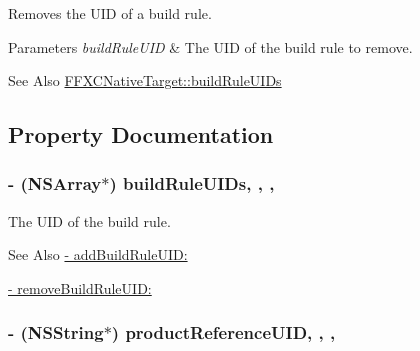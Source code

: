 Removes the U\-I\-D of a build rule. 
\begin{DoxyParams}{Parameters}
{\em build\-Rule\-U\-I\-D} & The U\-I\-D of the build rule to remove. \\
\hline
\end{DoxyParams}
\begin{DoxySeeAlso}{See Also}
\hyperlink{interface_f_f_x_c_native_target_a881d7216349651546c101b1b0ca569ab}{F\-F\-X\-C\-Native\-Target\-::build\-Rule\-U\-I\-Ds} 
\end{DoxySeeAlso}


\subsection{Property Documentation}
\hypertarget{interface_f_f_x_c_native_target_a881d7216349651546c101b1b0ca569ab}{
\subsubsection[{build\-Rule\-U\-I\-Ds}]{\setlength{\rightskip}{0pt plus 5cm}-\/ (N\-S\-Array$\ast$) build\-Rule\-U\-I\-Ds\hspace{0.3cm}{\ttfamily [read]}, {\ttfamily [write]}, {\ttfamily [nonatomic]}, {\ttfamily [strong]}}}\label{interface_f_f_x_c_native_target_a881d7216349651546c101b1b0ca569ab}
The U\-I\-D of the build rule. \begin{DoxySeeAlso}{See Also}
\hyperlink{interface_f_f_x_c_native_target_a4bdf8ae29d9d42620a43fb533b0a37b8}{-\/ add\-Build\-Rule\-U\-I\-D\-:} 

\hyperlink{interface_f_f_x_c_native_target_a4ff3a4e224ba3bab7b2bfa594ae38a06}{-\/ remove\-Build\-Rule\-U\-I\-D\-:} 
\end{DoxySeeAlso}
\hypertarget{interface_f_f_x_c_native_target_a0a3459af4b56178e0715784b632583ad}{
\subsubsection[{product\-Reference\-U\-I\-D}]{\setlength{\rightskip}{0pt plus 5cm}-\/ (N\-S\-String$\ast$) product\-Reference\-U\-I\-D\hspace{0.3cm}{\ttfamily [read]}, {\ttfamily [write]}, {\ttfamily [nonatomic]}, {\ttfamily [strong]}}}\label{interface_f_f_x_c_native_target_a0a3459af4b56178e0715784b632583ad}

